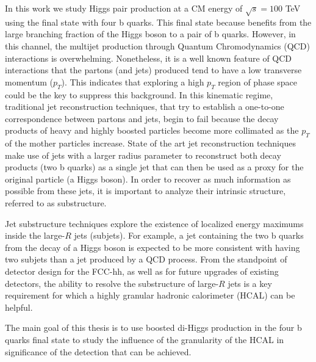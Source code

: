 In this work we study Higgs pair production at a CM energy of $\sqrt{s}=100$ TeV using the final state with four b quarks. This final state because benefits from the large branching fraction of the Higgs boson to a pair of b quarks. However, in this channel, the multijet production through Quantum Chromodynamics (QCD) interactions is overwhelming. Nonetheless, it is a well known feature of QCD interactions that the partons (and jets) produced tend to have a low transverse momentum ($p_T$). This indicates that exploring a high $p_T$ region of phase space could be the key to suppress this background. In this kinematic regime, traditional jet reconstruction techniques, that try to establish a one-to-one correspondence between partons and jets, begin to fail because the decay products of heavy and highly boosted particles become more collimated as the $p_T$ of the mother particles increase. State of the art jet reconstruction techniques make use of jets with a larger radius parameter to reconstruct both decay products (two b quarks) as a single jet that can then be used as a proxy for the original particle (a Higgs boson). In order to recover as much information as possible from these jets, it is important to analyze their intrinsic structure, referred to as substructure. 

Jet substructure techniques explore the existence of localized energy maximums inside the large-$R$ jets (subjets). For example, a jet containing the two b quarks from the decay of a Higgs boson is expected to be more consistent with having two subjets than a jet produced by a QCD process. From the standpoint of detector design for the FCC-hh, as well as for future upgrades of existing detectors, the ability to resolve the substructure of large-$R$ jets is a key requirement for which a highly granular hadronic calorimeter (HCAL) can be helpful.

The main goal of this thesis is to use boosted di-Higgs production in the four b quarks final state to study the influence of the granularity of the HCAL in significance of the detection that can be achieved.


